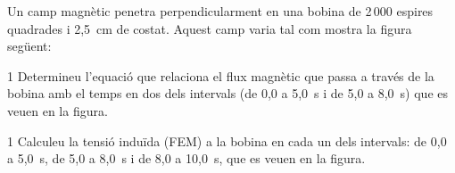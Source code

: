 Un camp magnètic penetra perpendicularment en una bobina de 2\,000 espires quadrades i 2,5~cm de costat. Aquest camp varia tal com mostra la figura següent:


\begin{apartat}{1}
Determineu l'equació que relaciona el flux magnètic que passa a través de la bobina amb el temps en dos dels intervals (de 0,0 a 5,0~s i de 5,0 a 8,0~s) que es veuen en la figura.
\end{apartat}

\begin{apartat}{1}
Calculeu la tensió induïda (FEM) a la bobina en cada un dels intervals: de 0,0 a 5,0~s, de 5,0 a 8,0~s i de 8,0 a 10,0~s, que es veuen en la figura.
\end{apartat}
